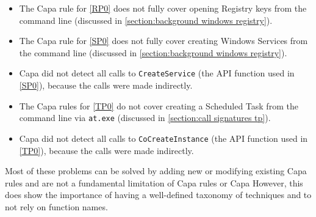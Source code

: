 \begin{itemize}
  \item The Capa rule for \autoref{RP0} does not fully cover opening Registry keys from the command line (discussed in \autoref{section:background windows registry}).

  \item The Capa rule for \autoref{SP0} does not fully cover creating Windows Services from the command line (discussed in \autoref{section:background windows registry}).

  \item Capa did not detect all calls to \texttt{CreateService} (the API function used in \autoref{SP0}), because the calls were made indirectly.

  \item The Capa rules for \autoref{TP0} do not cover creating a Scheduled Task from the command line via \texttt{at.exe} (discussed in \autoref{section:call signatures tp}).

  \item Capa did not detect all calls to \texttt{CoCreateInstance} (the API function used in \autoref{TP0}), because the calls were made indirectly.
\end{itemize}

Most of these problems can be solved by adding new or modifying existing Capa rules and are not a fundamental limitation of Capa rules or Capa However, this does show the importance of having a well-defined taxonomy of techniques and to not rely on function names.

